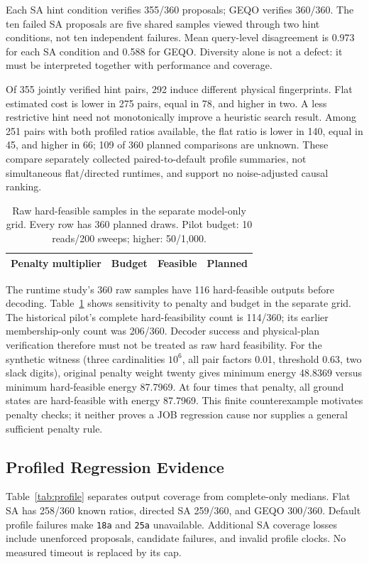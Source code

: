 \documentclass[conference]{IEEEtran}
\begin{document}
Each SA hint condition verifies 355/360 proposals; GEQO verifies 360/360.
The ten failed SA proposals are five shared samples viewed through two hint
conditions, not ten independent failures. Mean query-level disagreement is
0.973 for each SA condition and 0.588 for GEQO. Diversity alone is not a defect:
it must be interpreted together with performance and coverage.

Of 355 jointly verified hint pairs, 292 induce different physical fingerprints.
Flat estimated cost is lower in 275 pairs, equal in 78, and higher in two.
A less restrictive hint need not monotonically improve a heuristic search result.
Among 251 pairs with both profiled ratios available, the flat ratio is lower in
140, equal in 45, and higher in 66; 109 of 360 planned comparisons are unknown.
These compare separately collected paired-to-default profile summaries, not
simultaneous flat/directed runtimes, and support no noise-adjusted causal ranking.

\begin{table}[t]
\caption{Raw hard-feasible samples in the separate model-only grid. Every row
has 360 planned draws. Pilot budget: 10 reads/200 sweeps; higher: 50/1,000.}
\label{tab:encoding}
\centering\small
\begin{tabular}{@{}llrr@{}}\toprule
Penalty multiplier & Budget & Feasible & Planned\\\midrule

\end{tabular}
\end{table}

The runtime study's 360 raw samples have 116 hard-feasible outputs before
decoding. Table~\ref{tab:encoding} shows sensitivity to penalty and budget in the
separate grid. The historical pilot's complete hard-feasibility count is 114/360;
its earlier membership-only count was 206/360. Decoder success and physical-plan
verification therefore must not be treated as raw hard feasibility.
For the synthetic witness (three cardinalities $10^6$, all pair factors 0.01,
threshold 0.63, two slack digits), original penalty weight twenty gives minimum
energy 48.8369 versus minimum hard-feasible energy 87.7969. At four times that
penalty, all ground states are hard-feasible with energy 87.7969. This finite
counterexample motivates penalty checks; it neither proves a JOB regression cause
nor supplies a general sufficient penalty rule.

\subsection{Profiled Regression Evidence}
Table~\ref{tab:profile} separates output coverage from complete-only medians.
Flat SA has 258/360 known ratios, directed SA 259/360, and GEQO 300/360. Default
profile failures make \texttt{18a} and \texttt{25a} unavailable. Additional SA
coverage losses include unenforced proposals, candidate failures, and invalid
profile clocks. No measured timeout is replaced by its cap.
\end{document}
